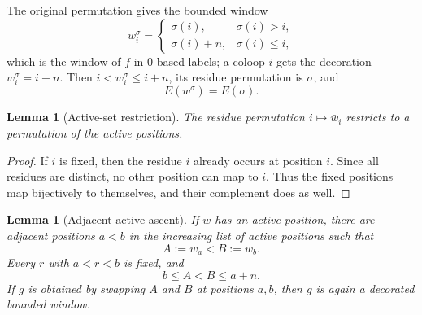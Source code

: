 \documentclass[11pt]{article}
\newtheorem{lemma}[theorem]{Lemma}
\theoremstyle{definition}
\begin{document}
The original permutation gives the bounded window
\begin{equation}
   w_i^\sigma=
   \begin{cases}
      \sigma(i),&\sigma(i)>i,\\
      \sigma(i)+n,&\sigma(i)\le i,
   \end{cases}
   \label{eq:wp-derangement-lift}
\end{equation}
which is the window of \(f\) in \(0\)-based labels; a coloop \(i\) gets the
decoration \(w_i^\sigma=i+n\). Then \(i<w_i^\sigma\le i+n\), its residue permutation is \(\sigma\), and
\begin{equation}
   E(w^\sigma)=E(\sigma).
   \label{eq:wp-lift-same-edges}
\end{equation}

\begin{lemma}[Active-set restriction]
\label{lem:wp-active-set}
The residue permutation \(i\mapsto\bar w_i\) restricts to a permutation of the
active positions.
\end{lemma}

\begin{proof}
If \(i\) is fixed, then the residue \(i\) already occurs at position \(i\).
Since all residues are distinct, no other position can map to \(i\). Thus the
fixed positions map bijectively to themselves, and their complement does as
well.
\end{proof}

\begin{lemma}[Adjacent active ascent]
\label{lem:wp-adjacent-active-ascent}
If \(w\) has an active position, there are adjacent positions \(a<b\) in the
increasing list of active positions such that
\[
   A:=w_a<B:=w_b.
\]
Every \(r\) with \(a<r<b\) is fixed, and
\begin{equation}
   b\le A<B\le a+n.
   \label{eq:wp-bridge-bounds}
\end{equation}
If \(g\) is obtained by swapping \(A\) and \(B\) at positions \(a,b\), then
\(g\) is again a decorated bounded window.
\end{lemma}
\end{document}
